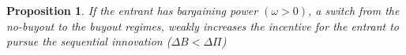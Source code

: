 \documentclass[12pt]{report}
\newtheorem{proposition}{Proposition}
\numberwithin{equation}{section}
\begin{document}
\begin{proposition} \label{excessincentive}
If the entrant has bargaining power $(\omega>0)$, a switch from the no-buyout to the buyout regimes, weakly increases the incentive for the entrant to pursue the sequential innovation ($\Delta B<\Delta \Pi$)
\end{proposition}
\end{document}

